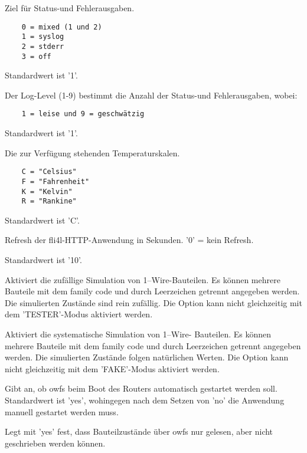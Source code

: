 \begin{description}
 Ziel für Status-und Fehlerausgaben.

\begin{verbatim}
    0 = mixed (1 und 2)
    1 = syslog
    2 = stderr
    3 = off
\end{verbatim}

Standardwert ist '1'.

 Der Log-Level (1-9) bestimmt die Anzahl der Status-und Fehlerausgaben, wobei:

\begin{verbatim}
    1 = leise und 9 = geschwätzig
\end{verbatim}

Standardwert ist '1'.

 Die zur Verfügung stehenden Temperaturskalen.
\begin{verbatim}
    C = "Celsius"
    F = "Fahrenheit"
    K = "Kelvin"
    R = "Rankine"
\end{verbatim}

Standardwert ist 'C'.

 Refresh der fli4l-HTTP-Anwendung in Sekunden. '0' = kein Refresh.

Standardwert ist '10'.

 Aktiviert die zufällige Simulation von 1--Wire-Bauteilen.
Es können mehrere Bauteile mit dem family code und
durch Leerzeichen getrennt angegeben werden. Die
simulierten Zustände sind rein zufällig. Die Option kann
nicht gleichzeitig mit dem 'TESTER'-Modus aktiviert werden.

 Aktiviert die systematische Simulation von 1--Wire-
Bauteilen. Es können mehrere Bauteile mit dem family
code und durch Leerzeichen getrennt angegeben werden.
Die simulierten Zustände folgen natürlichen Werten.
Die Option kann nicht gleichzeitig mit dem 'FAKE'-Modus
aktiviert werden.

 Gibt an, ob owfs beim Boot des Routers automatisch
gestartet werden soll. Standardwert ist 'yes', wohingegen
nach dem Setzen von 'no' die Anwendung manuell gestartet
werden muss.

 Legt mit 'yes' fest, dass Bauteilzustände über owfs nur
gelesen, aber nicht geschrieben werden können.


\end{description}
